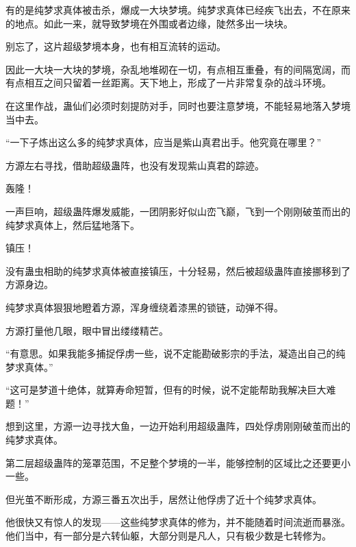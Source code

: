 \begin{this_body}
有的是纯梦求真体被击杀，爆成一大块梦境。纯梦求真体已经疾飞出去，不在原来的地点。如此一来，就导致梦境在外围或者边缘，陡然多出一块块。

别忘了，这片超级梦境本身，也有相互流转的运动。

因此一大块一大块的梦境，杂乱地堆砌在一切，有点相互重叠，有的间隔宽阔，而有点相互之间只留着一丝距离。天下地上，形成了一片非常复杂的战斗环境。

在这里作战，蛊仙们必须时刻提防对手，同时也要注意梦境，不能轻易地落入梦境当中去。

“一下子炼出这么多的纯梦求真体，应当是紫山真君出手。他究竟在哪里？”

方源左右寻找，借助超级蛊阵，也没有发现紫山真君的踪迹。

轰隆！

一声巨响，超级蛊阵爆发威能，一团阴影好似山峦飞巅，飞到一个刚刚破茧而出的纯梦求真体上，然后猛地落下。

镇压！

没有蛊虫相助的纯梦求真体被直接镇压，十分轻易，然后被超级蛊阵直接挪移到了方源身边。

纯梦求真体狠狠地瞪着方源，浑身缠绕着漆黑的锁链，动弹不得。

方源打量他几眼，眼中冒出缕缕精芒。

“有意思。如果我能多捕捉俘虏一些，说不定能勘破影宗的手法，凝造出自己的纯梦求真体。”

“这可是梦道十绝体，就算寿命短暂，但有的时候，说不定能帮助我解决巨大难题！”

想到这里，方源一边寻找大鱼，一边开始利用超级蛊阵，四处俘虏刚刚破茧而出的纯梦求真体。

第二层超级蛊阵的笼罩范围，不足整个梦境的一半，能够控制的区域比之还要更小一些。

但光茧不断形成，方源三番五次出手，居然让他俘虏了近十个纯梦求真体。

他很快又有惊人的发现——这些纯梦求真体的修为，并不能随着时间流逝而暴涨。他们当中，有一部分是六转仙躯，大部分则是凡人，只有极少数是七转修为。

\end{this_body}

